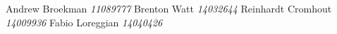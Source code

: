 \begin{flushright}
	Andrew Broekman		\emph{11089777}		\newline
	Brenton Watt 		\emph{14032644} 	\newline
	Reinhardt Cromhout 		\emph{14009936} 	\newline
	Fabio Loreggian 		\emph{14040426} 	\newline
\end{flushright}
